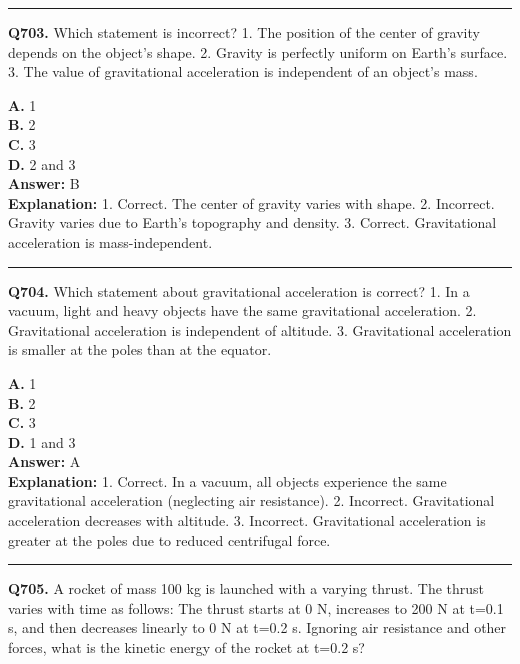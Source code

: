 \documentclass[12pt]{article}
\begin{document}
\hrule
\vspace{1em}


\noindent
\textbf{Q703.} Which statement is incorrect?
1.
The position of the center of gravity depends on the object’s shape.
2.
Gravity is perfectly uniform on Earth’s surface.
3.
The value of gravitational acceleration is independent of an object’s mass.



\textbf{A.} 1 \\
\textbf{B.} 2 \\
\textbf{C.} 3 \\
\textbf{D.} 2 and 3 \\

\textbf{Answer:} B \\
\textbf{Explanation:} 1.
Correct. The center of gravity varies with shape.
2.
Incorrect. Gravity varies due to Earth’s topography and density.
3.
Correct. Gravitational acceleration is mass-independent.

\hrule
\vspace{1em}


\noindent
\textbf{Q704.} Which statement about gravitational acceleration is correct?
1.
In a vacuum, light and heavy objects have the same gravitational acceleration.
2.
Gravitational acceleration is independent of altitude.
3.
Gravitational acceleration is smaller at the poles than at the equator.



\textbf{A.} 1 \\
\textbf{B.} 2 \\
\textbf{C.} 3 \\
\textbf{D.} 1 and 3 \\

\textbf{Answer:} A \\
\textbf{Explanation:} 1.
Correct. In a vacuum, all objects experience the same gravitational acceleration (neglecting air resistance).
2.
Incorrect. Gravitational acceleration decreases with altitude.
3.
Incorrect. Gravitational acceleration is greater at the poles due to reduced centrifugal force.

\hrule
\vspace{1em}


\noindent
\textbf{Q705.} A rocket of mass 100 kg is launched with a varying thrust. The thrust varies with time as follows:
The thrust starts at 0 N, increases to 200 N at t=0.1 s, and then decreases linearly to 0 N at t=0.2 s.
Ignoring air resistance and other forces, what is the kinetic energy of the rocket at t=0.2 s?
\end{document}
